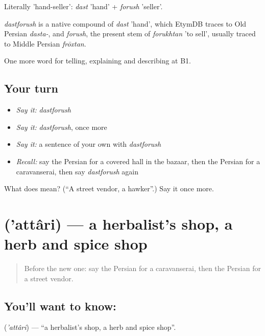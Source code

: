 Literally 'hand-seller': \emph{dast} 'hand' + \emph{forush} 'seller'.

\begin{cousinweb}
\emph{dastforush} is a native compound of \emph{dast} 'hand', which EtymDB traces to Old Persian \emph{dasta-}, and \emph{forush}, the present stem of \emph{forukhtan} 'to sell', usually traced to Middle Persian \emph{frōxtan}.
\end{cousinweb}

\begin{grammarlens}[title={What you've built}]
One more word for telling, explaining and describing at B1.
\end{grammarlens}

\subsection*{Your turn}
\begin{itemize}
\raggedright
  \item \emph{Say it:} \emph{dastforush}
  \item \emph{Say it:} \emph{dastforush}, once more
  \item \emph{Say it:} a sentence of your own with \emph{dastforush}
  \item \emph{Recall:} say the Persian for a covered hall in the bazaar, then the Persian for a caravanserai, then say \emph{dastforush} again
\end{itemize}

\begin{tcolorbox}[breakable,colback=teal!4,colframe=teal!35!black,title={Before you move on}]
What does  mean? (\textquotedblleft{}A street vendor, a hawker\textquotedblright{}.) Say it once more.
\end{tcolorbox}
\section[\texorpdfstring{\fa{عطاری} ('attâri)}{عطاری ('attâri)}]{ ('attâri) — a herbalist's shop, a herb and spice shop}

\label{lesson:FA-C458-attari}



\begin{quote}
Before the new one: say the Persian for a caravanserai, then the Persian for a street vendor.
\end{quote}

\subsection*{You'll want to know: }
\textbf{} (\emph{'attâri}) — \textquotedblleft{}a herbalist's shop, a herb and spice shop\textquotedblright{}.

